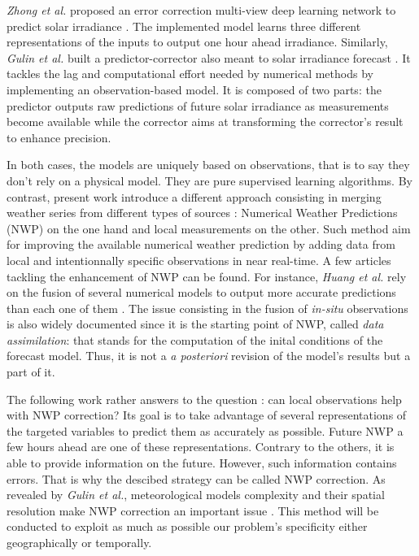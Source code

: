 \documentclass{article}
\newcommand{\saut}{\vspace{10px}}
\begin{document}
\saut

\emph{Zhong et al.} proposed an error correction multi-view deep learning network to predict
solar irradiance \cite{zhong_multi-view_2021}. The implemented model learns three different representations of the inputs 
to output one hour ahead irradiance. Similarly, \emph{Gulin et al.} built a predictor-corrector also meant to solar irradiance
forecast \cite{gulin_predictor-corrector_2015}. It tackles the lag and computational effort needed by numerical methods by implementing an observation-based model. It is composed of two parts: the predictor outputs raw
predictions of future solar irradiance as measurements become available while the corrector aims at transforming
the corrector's result to enhance precision.

\saut

In both cases, the models are uniquely based on observations, that is to say they don't rely on a physical model.
They are pure supervised learning algorithms. By contrast, present work introduce a different approach consisting in
merging weather series from different types of sources : Numerical Weather Predictions (NWP) on the one hand and
local measurements on the other. Such method aim for improving the available numerical weather prediction by 
adding data from local and intentionnally specific observations in near real-time. A few articles tackling the
enhancement of NWP can be found. For instance, \emph{Huang et al.} rely on the fusion of several numerical models to 
output more accurate predictions than each one of them \cite{huang_integrating_2012}. The issue consisting in the fusion 
of \emph{in-situ} observations is also widely documented since it is the starting point of NWP, called
\emph{data assimilation}: that stands for the computation
of the inital conditions of the forecast model. Thus, it is not a \emph{a posteriori} revision of the model's results but
a part of it. 

\saut

The following work rather answers to the question : can local observations help with NWP correction?
Its goal is to take advantage of several representations of the targeted variables to predict them as accurately as
possible. Future NWP a few hours ahead are one of these representations. Contrary to the
others, it is able to provide information on the future. However, such information contains errors. That is why
the descibed strategy can be called NWP correction.
As revealed by \emph{Gulin et al.}, meteorological models complexity and their spatial resolution make NWP
correction an important issue \cite{gulin_predictor-corrector_2015}. This method will be conducted to
exploit as much as possible our problem's specificity either geographically or temporally.
\end{document}
